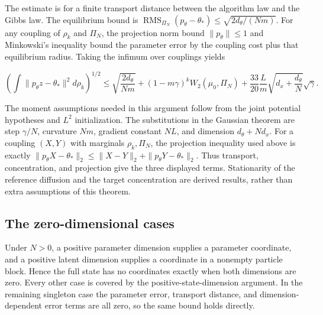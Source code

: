 \documentclass[11pt,a4paper]{article}
\begin{document}
The estimate is for a finite transport distance between the algorithm law and the Gibbs law. The equilibrium bound is \(\operatorname{RMS}_{\Pi_N}(p_\theta-\theta_*)\le\sqrt{2d_\theta/(Nm)}\). For any coupling of \(\rho_k\) and \(\Pi_N\), the projection norm bound \(\|p_\theta\|\le1\) and Minkowski’s inequality bound the parameter error by the coupling cost plus that equilibrium radius. Taking the infimum over couplings yields

\[\left(\int\|p_\theta z-\theta_*\|^2d\rho_k\right)^{1/2}\le\sqrt{\frac{2d_\theta}{Nm}}+(1-m\gamma)^kW_2(\mu_0,\Pi_N)+\frac{33}{20}\frac Lm\sqrt{d_x+\frac{d_\theta}{N}}\sqrt\gamma.\]

The moment assumptions needed in this argument follow from the joint potential hypotheses and \(L^2\) initialization. The substitutions in the Gaussian theorem are step \(\gamma/N\), curvature \(Nm\), gradient constant \(NL\), and dimension \(d_\theta+Nd_x\). For a coupling \((X,Y)\) with marginals \(\rho_k,\Pi_N\), the projection inequality used above is exactly \(\|p_\theta X-\theta_*\|_2\le\|X-Y\|_2+\|p_\theta Y-\theta_*\|_2\). Thus transport, concentration, and projection give the three displayed terms. Stationarity of the reference diffusion and the target concentration are derived results, rather than extra assumptions of this theorem.




\subsection{\texorpdfstring{The zero-dimensional cases}{The zero-dimensional cases}}


Under \(N>0\), a positive parameter dimension supplies a parameter coordinate, and a positive latent dimension supplies a coordinate in a nonempty particle block. Hence the full state has no coordinates exactly when both dimensions are zero. Every other case is covered by the positive-state-dimension argument. In the remaining singleton case the parameter error, transport distance, and dimension-dependent error terms are all zero, so the same bound holds directly.
\end{document}
